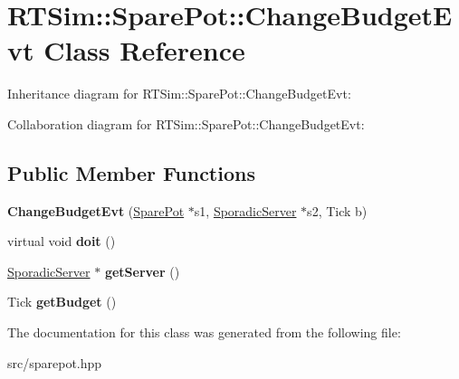 \hypertarget{classRTSim_1_1SparePot_1_1ChangeBudgetEvt}{}\section{R\+T\+Sim\+:\+:Spare\+Pot\+:\+:Change\+Budget\+Evt Class Reference}
\label{classRTSim_1_1SparePot_1_1ChangeBudgetEvt}


Inheritance diagram for R\+T\+Sim\+:\+:Spare\+Pot\+:\+:Change\+Budget\+Evt\+:


Collaboration diagram for R\+T\+Sim\+:\+:Spare\+Pot\+:\+:Change\+Budget\+Evt\+:
\subsection*{Public Member Functions}
\begin{DoxyCompactItemize}
\item 
{\bfseries Change\+Budget\+Evt} (\hyperlink{classRTSim_1_1SparePot}{Spare\+Pot} $\ast$s1, \hyperlink{classRTSim_1_1SporadicServer}{Sporadic\+Server} $\ast$s2, Tick b)\hypertarget{classRTSim_1_1SparePot_1_1ChangeBudgetEvt_af8b2671ea1a8fc3e82990a42bf23d3dd}{}\label{classRTSim_1_1SparePot_1_1ChangeBudgetEvt_af8b2671ea1a8fc3e82990a42bf23d3dd}

\item 
virtual void {\bfseries doit} ()\hypertarget{classRTSim_1_1SparePot_1_1ChangeBudgetEvt_a1fe584426aeff4170246f42371342fa8}{}\label{classRTSim_1_1SparePot_1_1ChangeBudgetEvt_a1fe584426aeff4170246f42371342fa8}

\item 
\hyperlink{classRTSim_1_1SporadicServer}{Sporadic\+Server} $\ast$ {\bfseries get\+Server} ()\hypertarget{classRTSim_1_1SparePot_1_1ChangeBudgetEvt_acad9422a6a0d509deca196a4933e32db}{}\label{classRTSim_1_1SparePot_1_1ChangeBudgetEvt_acad9422a6a0d509deca196a4933e32db}

\item 
Tick {\bfseries get\+Budget} ()\hypertarget{classRTSim_1_1SparePot_1_1ChangeBudgetEvt_a21d299eda490f35d8b0ec84e61433109}{}\label{classRTSim_1_1SparePot_1_1ChangeBudgetEvt_a21d299eda490f35d8b0ec84e61433109}

\end{DoxyCompactItemize}


The documentation for this class was generated from the following file\+:\begin{DoxyCompactItemize}
\item 
src/sparepot.\+hpp\end{DoxyCompactItemize}
